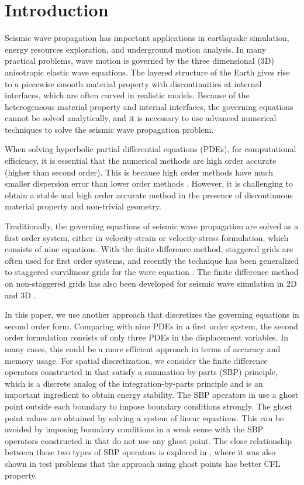 \section{Introduction}
Seismic wave propagation has important applications in earthquake simulation, energy resources exploration, and underground motion analysis. In many practical problems, wave motion is governed by the three dimensional (3D) anisotropic elastic wave equations. The layered structure of the Earth gives rise to a piecewise smooth material property with discontinuities at internal interfaces, which are often curved in realistic models. Because of the heterogeneous material property and internal interfaces, the governing equations cannot be solved analytically, and it is necessary to use advanced numerical techniques to solve the seismic wave propagation problem.

When solving hyperbolic partial differential equations (PDEs), for computational efficiency, it is essential that the numerical methods are high order accurate (higher than second order). This is because high order methods have much smaller dispersion error than lower order methods \cite{Hagstrom2012, Kreiss1972}. However, it is challenging to obtain a stable and high order accurate method in the presence of discontinuous material property and non-trivial geometry. 

Traditionally, the governing equations of seismic wave propagation are solved as a first order system, either in velocity-strain or velocity-stress formulation, which consists of nine equations. With the finite difference method, staggered grids are often used for first order systems, and recently the technique has been generalized to staggered curvilinear grids for the wave equation \cite{OReilly2020}. The finite difference method on non-staggered grids has also been developed for seismic wave simulation in 2D \cite{Kozdon2013} and 3D \cite{Duru2016}.

In this paper, we use another approach that discretizes the governing equations in second order form. Comparing with nine PDEs in a first order system, the second order formulation consists of only three PDEs in the displacement variables. In many cases, this could be a more efficient approach in terms of accuracy and memory usage. For spatial discretization, we consider the finite difference operators constructed in \cite{sjogreen2012fourth} that satisfy a summation-by-parts (SBP) principle, which is a discrete analog of the integration-by-parts principle and is an important ingredient to obtain energy stability. The SBP operators in \cite{sjogreen2012fourth} use a ghost point outside each boundary to impose boundary conditions strongly. The ghost point values are obtained by solving a system of linear equations. This can be avoided by imposing boundary conditions in a weak sense \cite{Carpenter1994} with the SBP operators constructed in \cite{Mattsson2012} that do not use any ghost point. The close relationship between these two types of SBP operators is explored in \cite{wang2018fourth}, where it was also shown in test problems that the approach using ghost points has better CFL property.

